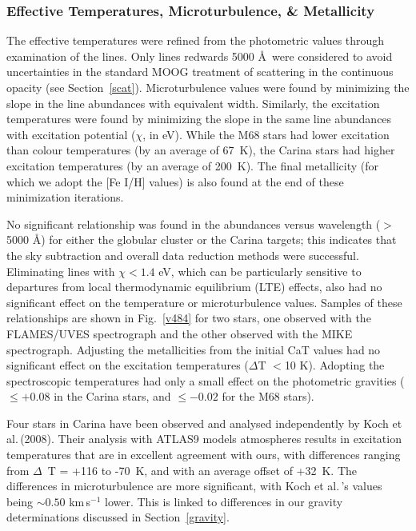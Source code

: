 \documentclass{emulateapj}
\newcommand\etal{{\rm et al.\,}}
\begin{document}
\subsubsection{Effective Temperatures, Microturbulence, \& Metallicity \label{temps}}

The effective temperatures were refined from the photometric values
through examination of the  lines.
Only lines redwards 5000 \AA\ were considered to 
avoid uncertainties in the standard MOOG treatment of 
scattering in the continuous opacity (see Section~\ref{scat}). 
Microturbulence values were found by minimizing the slope in
the  line abundances with equivalent width.
Similarly, the excitation temperatures were found by minimizing 
the slope in the same  line abundances with 
excitation potential ($\chi$, in eV).   
%
While the M68 stars had lower excitation than colour temperatures 
(by an average of 67~K), the Carina stars had higher excitation 
temperatures (by an average of 200~K).   The final
metallicity (for which we adopt the [Fe I/H] values)
is also found at the end of these minimization iterations.

No significant relationship was found in the  abundances
versus wavelength ($>$5000 \AA) for either the globular cluster or the
Carina targets;  this indicates that the sky subtraction and overall
data reduction methods were successful.
Eliminating lines with $\chi < 1.4$ eV, which can be particularly
sensitive to departures from local thermodynamic equilibrium (LTE) 
effects, also had no significant effect on the 
temperature or microturbulence values.
%
Samples of these relationships are shown in Fig.~\ref{v484} 
for two stars, one observed with the FLAMES/UVES spectrograph 
and the other observed with the MIKE spectrograph. 
%
Adjusting the metallicities from the initial CaT values 
had no significant effect on the excitation temperatures 
($\Delta$T $<$10 K). 
Adopting the spectroscopic temperatures had only a small effect on 
the photometric gravities 
($\le +0.08$ in the Carina stars, and $\le -0.02$ for the M68 stars).

Four stars in Carina have been observed and analysed independently
by Koch \etal (2008).   Their analysis with ATLAS9 models atmospheres
results in excitation temperatures that are in excellent agreement 
with ours, with differences ranging from $\Delta$~T = +116 to -70~K, 
and with an average offset of +32~K.   The differences in 
microturbulence are more significant, with Koch \etal's values 
being $\sim 0.50$ km\,s$^{-1}$ lower.    This is linked to differences 
in our gravity determinations discussed in Section~\ref{gravity}.
\end{document}

